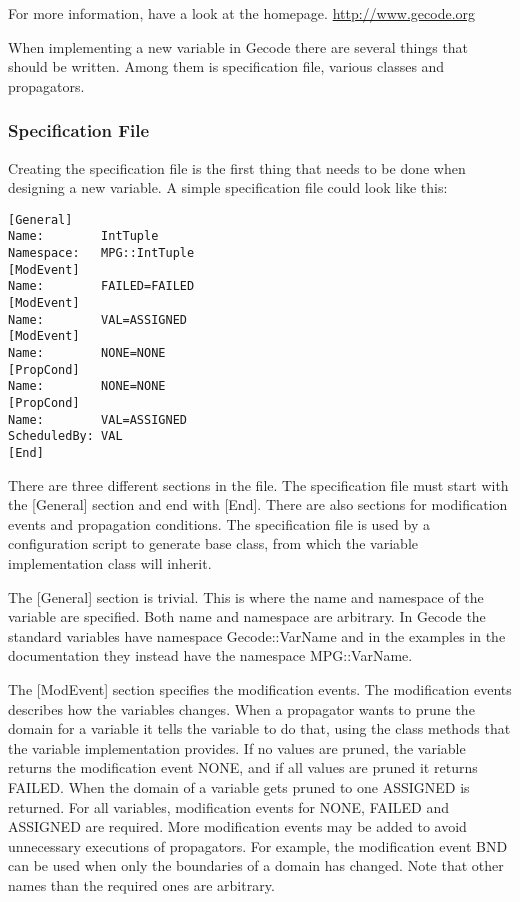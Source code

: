 \documentclass[a4paper,11pt]{article}
\begin{document}
For more information, have a look at the homepage. \url{http://www.gecode.org}

When implementing a new variable in Gecode there are several things that should be written. Among them is specification file, various classes and propagators.
\subsubsection{Specification File}
Creating the specification file is the first thing that needs to be done when designing a new variable.  A simple specification file could look like this:

\begin{lstlisting}[frame=single]
[General]
Name:        IntTuple
Namespace:   MPG::IntTuple
[ModEvent]
Name:        FAILED=FAILED
[ModEvent]
Name:        VAL=ASSIGNED
[ModEvent]
Name:        NONE=NONE
[PropCond]
Name:        NONE=NONE
[PropCond]
Name:        VAL=ASSIGNED
ScheduledBy: VAL
[End]
\end{lstlisting}
There are three different sections in the file. The specification file must start with the [General] section and end with [End]. There are also sections for modification events and propagation conditions. The specification file is used by a configuration script to generate base class, from which the variable implementation class will inherit.

The [General] section is trivial. This is where the name and namespace of the variable are specified. Both name and namespace are arbitrary. In Gecode the standard variables have namespace Gecode::VarName and in the examples in the documentation they instead have the namespace MPG::VarName.

The [ModEvent] section specifies the modification events. The modification events describes how the variables changes. When a propagator wants to prune the domain for a variable it tells the variable to do that, using the class methods that the variable implementation provides. If no values are pruned, the variable returns the modification event NONE, and if all values are pruned it returns FAILED. When the domain of a variable gets pruned to one ASSIGNED is returned. For all variables, modification events for NONE, FAILED and ASSIGNED are required. More modification events may be added to avoid unnecessary executions of propagators. For example, the modification event BND can be used when only the boundaries of a domain has changed. Note that other names than the required ones are arbitrary.
\end{document}
